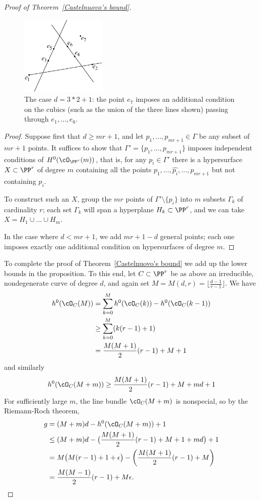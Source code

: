 \begin{proof}[Proof of Theorem~\ref{Castelnuovo's bound}]
\begin{figure}
\centerline {\includegraphics[height=1.5in]{"main/Fig09-3"}}
\caption{The case $d = 3*2+1$: the point $e_{7}$ imposes an additional
condition on the cubics (such as the union of the three lines shown) passing through
$e_{1},\dots, e_{6}$.}
\label{Fig9.3}
\end{figure}

\begin{proof}
Suppose first that $d \geq mr+1$, and let $p_1,\dots,p_{mr+1} \in \Gamma$ be any subset of $mr+1$ points. It suffices to show that $\Gamma' = \{p_1,\dots,p_{mr+1}\}$ imposes independent conditions of $H^0(\cO_{\PP^r}(m))$, that is, for any $p_i \in \Gamma'$ there is a hypersurface $X \subset \PP^r$ of degree $m$ containing all the points $p_1,\dots, \hat{p_i},\dots,p_{mr+1}$ but not containing $p_i$.

To construct such an $X$, group the $mr$ points of $\Gamma' \setminus \{p_i\}$ into $m$ subsets $\Gamma_k$ of cardinality $r$; each set $\Gamma_k$ will span a hyperplane $H_k \subset \PP^r$, and we can take $X = H_1 \cup \dots \cup H_m$. 

In the case where $d<mr+1$, we add $mr+1-d$ general points; each one imposes exactly one
additional condition on hypersurfaces of degree $m$.
\end{proof}


To complete the proof of Theorem~\ref{Castelnuovo's bound} we add up the lower bounds in the proposition. To this end, let $C \subset \PP^r$ be as above an irreducible, nondegenerate curve of degree $d$, and again set 
$M = M(d,r) = \lfloor{\frac{d-1}{r-1}}\rfloor$.
We have 
\begin{align*}
h^0(\cO_C(M)) &= \sum_{k=0}^M h^0(\cO_C(k)) - h^0(\cO_C(k-1)) \\
&\geq  \sum_{k=0}^M (k(r-1)+1) \\
&= \frac{M(M+1)}{2}(r-1) + M + 1
\end{align*}
and similarly
$$
h^0(\cO_C(M+m)) \geq \frac{M(M+1)}{2}(r-1) + M  + md+ 1
$$
For sufficiently large $m$, the line bundle $\cO_C(M+m)$ is nonspecial, so by the Riemann-Roch theorem,
\begin{align*}
g &= (M+m)d - h^0(\cO_C(M+m)) + 1 \\
&\leq (M+m)d - \bigl(  \frac{M(M+1)}{2}(r-1) + M + 1 + md \bigr)+1 \\
& = M\bigl( M(r-1) + 1 + \epsilon \bigr) - \left(  \frac{M(M+1)}{2}(r-1) + M  \right) \\
&= \frac{M(M-1)}{2}(r-1) + M\epsilon.
\end{align*}



\end{proof}
